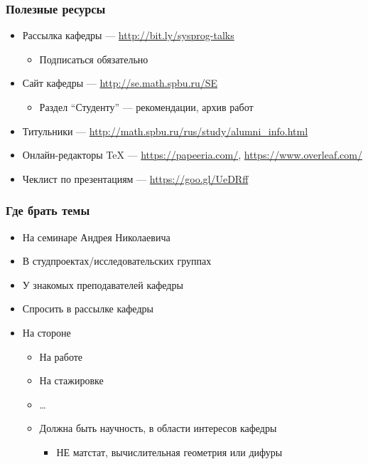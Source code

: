\documentclass[xetex,mathserif,serif]{beamer}
\begin{document}
	\begin{frame}
		\frametitle{Полезные ресурсы}
		\begin{itemize}
			\item Рассылка кафедры --- \url{http://bit.ly/sysprog-talks}
			\begin{itemize}
				\item Подписаться обязательно
			\end{itemize}
			\item Сайт кафедры --- \url{http://se.math.spbu.ru/SE}
			\begin{itemize}
				\item Раздел ``Студенту'' --- рекомендации, архив работ
			\end{itemize}
			\item Титульники --- \url{http://math.spbu.ru/rus/study/alumni\_info.html}
			\item Онлайн-редакторы TeX --- \url{https://papeeria.com/}, \url{https://www.overleaf.com/}
			\item Чеклист по презентациям --- \url{https://goo.gl/UeDRff}
		\end{itemize}
	\end{frame}

	\begin{frame}
		\frametitle{Где брать темы}
		\begin{itemize}
			\item На семинаре Андрея Николаевича
			\item В студпроектах/исследовательских группах
			\item У знакомых преподавателей кафедры
			\item Спросить в рассылке кафедры
			\item На стороне
			\begin{itemize}
				\item На работе
				\item На стажировке
				\item \dots
				\item Должна быть научность, в области интересов кафедры
				\begin{itemize}
					\item НЕ матстат, вычислительная геометрия или дифуры
				\end{itemize}
			\end{itemize}
		\end{itemize}
	\end{frame}
\end{document}
